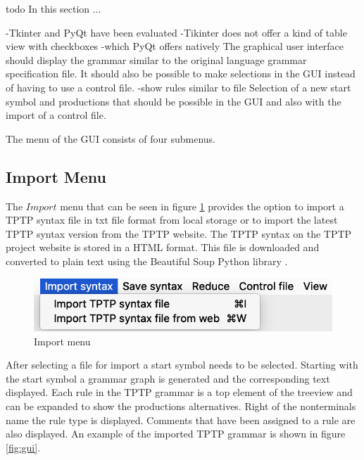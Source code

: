 todo
In this section ...
 
-Tkinter and PyQt have been evaluated
-Tikinter does not offer a kind of table view with checkboxes
-which PyQt offers natively
The graphical user interface should display the grammar similar to the original language grammar specification file.
It should also be possible to make selections in the GUI instead of having to use a control file. 
-show rules similar to file
Selection of a new start symbol and productions that should be possible in the GUI and also with the import of a control file.

The menu of the GUI consists of four submenus.

\subsection{Import Menu}\label{sec:ConceptGUIImportMenu}

The $Import$ menu that can be seen in figure \ref{fig:import} provides the option to import a TPTP syntax file in txt file format from local storage or to import the latest TPTP syntax version from the TPTP website.
The TPTP syntax on the TPTP project website is stored in a HTML format.
This file is downloaded and converted to plain text using the Beautiful Soup Python library \cite{BeautifulSoup}.

\begin{figure}[H]
\centering
\includegraphics[width=.7\textwidth]{images/import.png}
\caption{Import menu}
\label{fig:import}
\end{figure}

After selecting a file for import a start symbol needs to be selected.
Starting with the start symbol a grammar graph is generated and the corresponding text displayed.
Each rule in the TPTP grammar is a top element of the treeview and can be expanded to show the productions alternatives.
Right of the nonterminals name the rule type is displayed.
Comments that have been assigned to a rule are also displayed. An example of the imported TPTP grammar is shown in figure \ref{fig:gui}.

